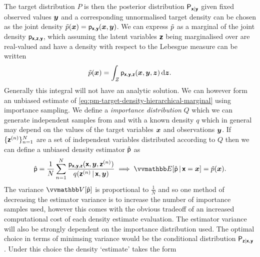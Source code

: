 The target distribution $P$ is then the posterior distribution $\mathsf{P}_{\boldsymbol{\mathsf{x}}|\boldsymbol{\mathsf{y}}}$ given fixed observed values $\boldsymbol{y}$ and a corresponding unnormalised target density can be chosen as the joint density $\tilde{p}(\boldsymbol{x}) = \mathsf{p}_{\boldsymbol{\mathsf{x}},\boldsymbol{\mathsf{y}}}(\boldsymbol{x},\boldsymbol{y})$. We can express $\tilde{p}$ as a marginal of the joint density $\mathsf{p}_{\boldsymbol{\mathsf{x}},\boldsymbol{\mathsf{z}},\boldsymbol{\mathsf{y}}}$, which assuming the latent variables $\boldsymbol{\mathsf{z}}$ being marginalised over are real-valued and have a density with respect to the Lebesgue measure can be written
\begin{equation}\label{eq:pm-target-density-hierarchical-marginal}
  \tilde{p}(\boldsymbol{x}) = 
  \int_{\mathit{Z}} \mathsf{p}_{\boldsymbol{\mathsf{x}},\boldsymbol{\mathsf{y}},\boldsymbol{\mathsf{z}}}(\boldsymbol{x},\boldsymbol{y},\boldsymbol{z}) \,\mathrm{d}\boldsymbol{z}.
\end{equation}
Generally this integral will not have an analytic solution. We can however form an unbiased estimate of \eqref{eq:pm-target-density-hierarchical-marginal} using importance sampling. We define a \emph{importance distribution} $Q$ which we can generate independent samples from and with a known density $q$ which in general may depend on the values of the target variables $\boldsymbol{x}$ and observations $\boldsymbol{y}$. If $\lbrace \boldsymbol{\mathsf{z}}^{(n)} \rbrace_{n=1}^N$ are a set of independent variables distributed according to $Q$ then we can define a unbiased density estimator $\hat{\mathsf{p}}$ as
\begin{equation}\label{eq:pm-hierarchical-model-importance-sampling-estimator}
  \hat{\rvar{p}} = \frac{1}{N} \sum_{n=1}^N \frac{\pden{\rvct{x},\rvct{y},\rvct{z}}(\rvct{x},\vct{y},\rvct{z}^{(n)})}{q(\rvct{z}^{(n)}\gvn\rvct{x},\vct{y})} \implies
  \expc{\hat{\rvar{p}}\gvn\rvct{x} = \vct{x}} = \utgtdens(\vct{x}).
\end{equation}
The variance $\var{\hat{\rvar{p}}}$ is proportional to $\frac{1}{N}$ and so one method of decreasing the estimator variance is to increase the number of importance samples used, however this comes with the obvious tradeoff of an increased computational cost of each density estimate evaluation. The estimator variance will also be strongly dependent on the importance distribution used. The optimal choice in terms of minimsing variance would be the conditional distribution $\mathsf{P}_{\boldsymbol{\mathsf{z}}|\boldsymbol{\mathsf{x}},\boldsymbol{\mathsf{y}}}$. Under this choice the density `estimate' takes the form
